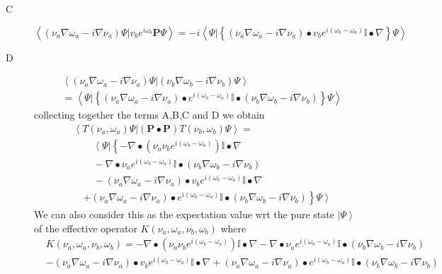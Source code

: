 \documentclass[aps,preprint]{revtex4}%
\begin{document}
\begin{description}
\item[C]
\begin{equation}
\left\langle \left(  \nu_{a}\nabla\omega_{a}-i\nabla\nu_{a}\right)  \Psi
|v_{b}e^{i\omega_{b}}\mathbf{P}\Psi\right\rangle =-i\left\langle \Psi|\left\{
\left(  \nu_{a}\nabla\omega_{a}-i\nabla\nu_{a}\right)  \bullet v_{b}%
e^{i\left(  \omega_{b}-\omega_{a}\right)  }\mathbb{I}\bullet\nabla\right\}
\Psi\right\rangle
\end{equation}


\item[D]
\begin{align}
&  \left\langle \left(  \nu_{a}\nabla\omega_{a}-i\nabla\nu_{a}\right)
\Psi|\left(  \nu_{b}\nabla\omega_{b}-i\nabla\nu_{b}\right)  \Psi\right\rangle
\nonumber\\
&  \left.  =\right.  \left\langle \Psi|\left\{  \left(  \nu_{a}\nabla
\omega_{a}-i\nabla\nu_{a}\right)  \bullet e^{i\left(  \omega_{b}-\omega
_{a}\right)  }\mathbb{I}\bullet\left(  \nu_{b}\nabla\omega_{b}-i\nabla\nu
_{b}\right)  \right\}  \Psi\right\rangle
\end{align}
collecting together the terms A,B,C and D we obtain%
\begin{align}
&  \left\langle T\left(  \nu_{a},\omega_{a}\right)  \Psi|\left(
\mathbf{P\bullet P}\right)  T\left(  \nu_{b},\omega_{b}\right)  \Psi
\right\rangle =\nonumber\\
&  \qquad\left\langle \Psi\right.  |\left\{  -\nabla\bullet\left(  \nu_{a}%
\nu_{b}e^{i\left(  \omega_{b}-\omega_{a}\right)  }\right)  \mathbb{I}%
\bullet\nabla\right. \nonumber\\
&  \qquad-\nabla\bullet\nu_{a}e^{i\left(  \omega_{b}-\omega_{a}\right)
}\mathbb{I}\bullet\left(  \nu_{b}\nabla\omega_{b}-i\nabla\nu_{b}\right)
\nonumber\\
&  \qquad-\left(  \nu_{a}\nabla\omega_{a}-i\nabla\nu_{a}\right)  \bullet
v_{b}e^{i\left(  \omega_{b}-\omega_{a}\right)  }\mathbb{I}\bullet
\nabla\nonumber\\
&  \quad\left.  +\left(  \nu_{a}\nabla\omega_{a}-i\nabla\nu_{a}\right)
\bullet e^{i\left(  \omega_{b}-\omega_{a}\right)  }\mathbb{I}\bullet\left(
\nu_{b}\nabla\omega_{b}-i\nabla\nu_{b}\right)  \right\}  \left.
\Psi\right\rangle
\end{align}
We can also consider this as the expectation value wrt the pure state
$\left\vert \Psi\right\rangle $ of the effective operator $K\left(  \nu
_{a},\omega_{a},\nu_{b},\omega_{b}\right)  $ where
\begin{align}
&  K\left(  \nu_{a},\omega_{a},\nu_{b},\omega_{b}\right)  =-\nabla
\bullet\left(  \nu_{a}\nu_{b}e^{i\left(  \omega_{b}-\omega_{a}\right)
}\right)  \mathbb{I}\bullet\nabla-\nabla\bullet\nu_{a}e^{i\left(  \omega
_{b}-\omega_{a}\right)  }\mathbb{I}\bullet\left(  \nu_{b}\nabla\omega
_{b}-i\nabla\nu_{b}\right) \nonumber\\
&  -\left(  \nu_{a}\nabla\omega_{a}-i\nabla\nu_{a}\right)  \bullet
v_{b}e^{i\left(  \omega_{b}-\omega_{a}\right)  }\mathbb{I}\bullet
\nabla+\left(  \nu_{a}\nabla\omega_{a}-i\nabla\nu_{a}\right)  \bullet
e^{i\left(  \omega_{b}-\omega_{a}\right)  }\mathbb{I}\bullet\left(  \nu
_{b}\nabla\omega_{b}-i\nabla\nu_{b}\right)
\end{align}


\end{description}
\end{document}
